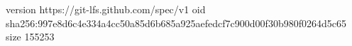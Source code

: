 version https://git-lfs.github.com/spec/v1
oid sha256:997e8d6c4e334a4cc50a85d6b685a925aefedcf7c900d00f30b980f0264d5c65
size 155253

